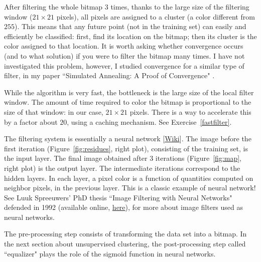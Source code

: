 \documentclass[10pt]{article}
\begin{document}
After filtering the whole bitmap 3 times, thanks to the large size of the filtering window ($21\times 21$ pixels), all pixels are assigned to a cluster (a color different from $255$). This means that any future point (not in the training set) can easily and efficiently be classified: first, find its location on the bitmap; then its cluster is the color assigned to that location. It is worth asking whether convergence occurs (and to what solution) if you were to filter the bitmap many times.  I have not investigated this problem, however, I studied convergence for a similar type of filter, in my paper
``Simulated Annealing: A Proof of Convergence" \cite{vgieee}.

While the algorithm is very fast, the bottleneck is the large size of the local filter window. The amount of time required to color the bitmap is proportional to the size of that window: in our case, $21\times 21$ pixels. There is a way to accelerate this by a factor about $20$, using a caching mechanism. See Exercise~\ref{fastfilter}. \\


\noindent The filtering system is essentially a \textcolor{index}{neural network} [\href{https://en.wikipedia.org/wiki/Neural_network}{Wiki}]. The image before the first iteration (Figure~\ref{fig:residues}, right plot), consisting of the training set,  is the input layer. The final image obtained after 3 iterations
(Figure~\ref{fig:map}, right plot) is the output layer. The intermediate iterations correspond to the hidden layers. In each layer, a pixel color is a function of quantities computed on neighbor pixels, in the previous layer. This is a classic example of neural network! See Luuk Spreeuwers' PhD thesis ``Image Filtering with Neural Networks" defended in 1992 \cite{luuk} (available online, \href{https://ris.utwente.nl/ws/portalfiles/portal/255169420/Thesis_L_Spreeuwers.pdf}{here}), for more about image filters used as neural networks.

\noindent The pre-processing step consists of transforming the data set into a bitmap. In the next section about unsupervised clustering, the post-processing step called ``equalizer" plays the role of the sigmoid function in neural networks.\\

\end{document}
